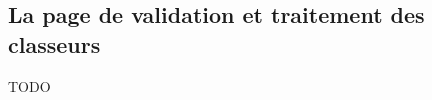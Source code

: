 \subsection{La page de validation et traitement des classeurs}
\label{subsec:spreadsheet-page}
TODO
